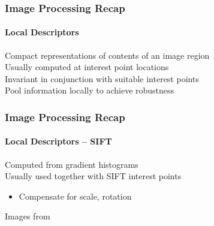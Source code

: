 \documentclass[xetex,professionalfont]{beamer}
\begin{document}

\begin{frame}
\frametitle{Image Processing Recap}
\framesubtitle{Local Descriptors}

Compact representations of contents of an image region\\\medskip
Usually computed at interest point locations\\\medskip %
Invariant in conjunction with suitable interest points\\\medskip %
Pool information locally to achieve robustness %

\end{frame}


\begin{frame}
\frametitle{Image Processing Recap}
\framesubtitle{Local Descriptors -- SIFT}

Computed from gradient histograms\\\medskip
Usually used together with SIFT interest points
\begin{itemize}
    \item Compensate for scale, rotation %
\end{itemize}

\begin{center}
    {\centering Images from \cite{prince12}}
\end{center}

\end{frame}

\end{document}
